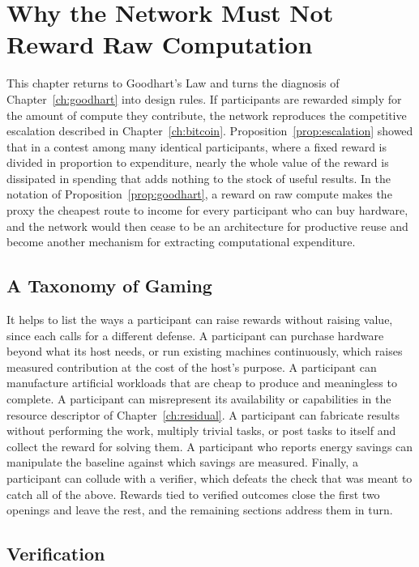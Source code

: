 \chapter[Not Rewarding Raw Computation]{Why the Network Must Not Reward Raw Computation}
\label{ch:norewards}

This chapter returns to Goodhart's Law and turns the diagnosis of Chapter~\ref{ch:goodhart} into design rules. If participants are rewarded simply for the amount of compute they contribute, the network reproduces the competitive escalation described in Chapter~\ref{ch:bitcoin}. Proposition~\ref{prop:escalation} showed that in a contest among many identical participants, where a fixed reward is divided in proportion to expenditure, nearly the whole value of the reward is dissipated in spending that adds nothing to the stock of useful results. In the notation of Proposition~\ref{prop:goodhart}, a reward on raw compute makes the proxy the cheapest route to income for every participant who can buy hardware, and the network would then cease to be an architecture for productive reuse and become another mechanism for extracting computational expenditure.

\section{A Taxonomy of Gaming}

It helps to list the ways a participant can raise rewards without raising value, since each calls for a different defense. A participant can purchase hardware beyond what its host needs, or run existing machines continuously, which raises measured contribution at the cost of the host's purpose. A participant can manufacture artificial workloads that are cheap to produce and meaningless to complete. A participant can misrepresent its availability or capabilities in the resource descriptor of Chapter~\ref{ch:residual}. A participant can fabricate results without performing the work, multiply trivial tasks, or post tasks to itself and collect the reward for solving them. A participant who reports energy savings can manipulate the baseline against which savings are measured. Finally, a participant can collude with a verifier, which defeats the check that was meant to catch all of the above. Rewards tied to verified outcomes close the first two openings and leave the rest, and the remaining sections address them in turn.

\section{Verification}

